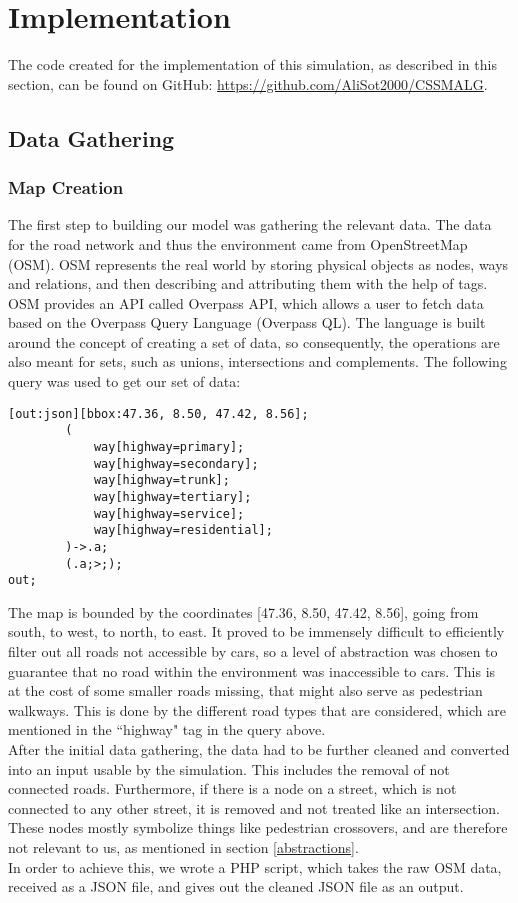 \section{Implementation}
The code created for the implementation of this simulation, as described in this section, can be found on GitHub: \href{https://github.com/AliSot2000/CSSMALG}{https://github.com/AliSot2000/CSSMALG}.
\subsection{Data Gathering}
\subsubsection{Map Creation}
The first step to building our model was gathering the relevant data. The data for the road network and thus the environment came from OpenStreetMap (OSM). OSM represents the real world by storing physical objects as nodes, ways and relations, and then describing and attributing them with the help of tags. 
OSM provides an API called Overpass API, which allows a user to fetch data based on the Overpass Query Language (Overpass QL). The language is built around the concept of creating a set of data, so consequently, the operations are also meant for sets, such as unions, intersections and complements. The following query was used to get our set of data:
\begin{lstlisting}
[out:json][bbox:47.36, 8.50, 47.42, 8.56];
        (
            way[highway=primary];
            way[highway=secondary];
            way[highway=trunk];
            way[highway=tertiary];
            way[highway=service];
            way[highway=residential];
        )->.a;
        (.a;>;);
out;
\end{lstlisting}

The map is bounded by the coordinates [47.36, 8.50, 47.42, 8.56], going from south, to west, to north, to east. It proved to be immensely difficult to efficiently filter out all roads not accessible by cars, so a level of abstraction was chosen to guarantee that no road within the environment was inaccessible to cars. This is at the cost of some smaller roads missing, that might also serve as pedestrian walkways. This is done by the different road types that are considered, which are mentioned in the ``highway" tag in the query above. \\
After the initial data gathering, the data had to be further cleaned and converted into an input usable by the simulation. This includes the removal of not connected roads. Furthermore, if there is a node on a street, which is not connected to any other street, it is removed and not treated like an intersection. These nodes mostly symbolize things like pedestrian crossovers, and are therefore not relevant to us, as mentioned in section \ref{abstractions}.\\
In order to achieve this, we wrote a PHP script, which takes the raw OSM data, received as a JSON file, and gives out the cleaned JSON file as an output.

